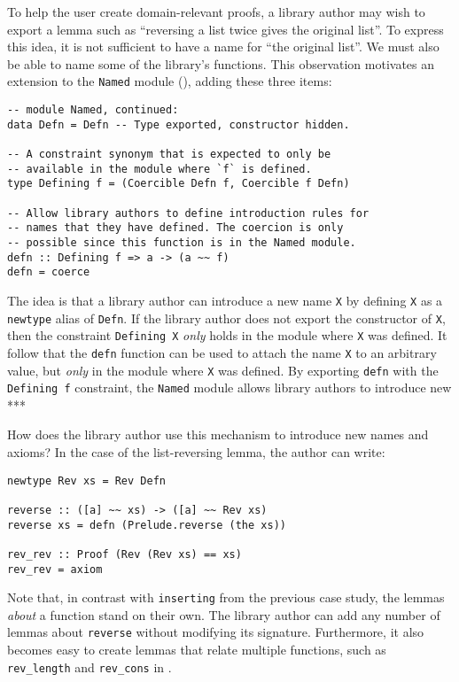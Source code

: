 \documentclass[format=sigplan, review=false, screen=true, 10pt]{acmart}
\makeatletter
\let\origsubsection\subsection
\renewcommand\subsection{\@ifstar{\starsubsection}{\nostarsubsection}}
\newcommand\nostarsubsection[1]
{\subsectionprelude\origsubsection{#1}\subsectionpostlude}
\newcommand\starsubsection[1]
{\subsectionprelude\origsubsection*{#1}\subsectionpostlude}
\newcommand\subsectionprelude{%
  \vspace{-0.25em}
}
\newcommand\subsectionpostlude{%
  \vspace{-0.05em}
}
\makeatother
\begin{document}
\subsection{Naming library functions}
To help the user create domain-relevant proofs, a library author may wish to export a lemma such
as ``reversing a list twice gives the original list''.
To express this idea, it is not sufficient to have a name for ``the original list''. We must also be able to
name some of the library's functions. This observation motivates an extension to the \texttt{Named} module (), adding these three items:

\begin{verbatim}
-- module Named, continued:
data Defn = Defn -- Type exported, constructor hidden.

-- A constraint synonym that is expected to only be
-- available in the module where `f` is defined.
type Defining f = (Coercible Defn f, Coercible f Defn)

-- Allow library authors to define introduction rules for
-- names that they have defined. The coercion is only
-- possible since this function is in the Named module.
defn :: Defining f => a -> (a ~~ f)
defn = coerce
\end{verbatim}

The idea is that a library author can introduce a new name \texttt{X} by
defining \texttt{X} as a \texttt{newtype} alias of \texttt{Defn}. If the library author does not
export the constructor of \texttt{X}, then the constraint \texttt{Defining X} \emph{only}
holds in the module where \texttt{X} was defined. It follow that the \texttt{defn} function
can be used to attach the name \texttt{X} to an arbitrary value, but \emph{only} in the
module where \texttt{X} was defined. By exporting \texttt{defn} with the \texttt{Defining f}
constraint, the \texttt{Named} module allows library authors to introduce new ***

How does the library author use this mechanism to introduce new names and axioms?
In the case of the list-reversing lemma, the author can write:
\begin{verbatim}
newtype Rev xs = Rev Defn

reverse :: ([a] ~~ xs) -> ([a] ~~ Rev xs)
reverse xs = defn (Prelude.reverse (the xs))

rev_rev :: Proof (Rev (Rev xs) == xs)
rev_rev = axiom
\end{verbatim}
Note that, in contrast with \texttt{inserting} from the previous case study,
the lemmas \emph{about} a function stand on their own.
The library author can add any number of lemmas about \texttt{reverse}
without modifying its signature. Furthermore, it also becomes easy to
create lemmas that relate multiple functions, such as \verb|rev_length|
and \verb|rev_cons| in .
\end{document}
